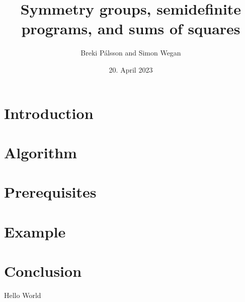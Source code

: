 \documentclass[]{article}
\begin{document}
\title{Symmetry groups, semidefinite programs, and sums of squares}
\author{Breki Pálsson and Simon Wegan}
\date{20. April 2023}

\maketitle

\tableofcontents


\section{Introduction}
\section{Algorithm}
\section{Prerequisites}
\section{Example}
\section{Conclusion}

\cite{Gatermann_2004}


Hello World
\end{document}
